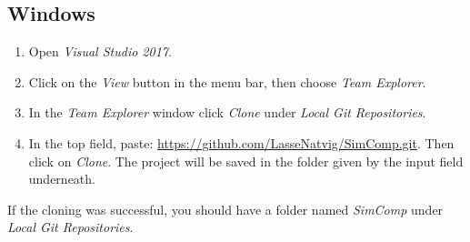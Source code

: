 \subsection{Windows}
\begin{enumerate}
    \item Open \textit{Visual Studio 2017}.
    \item Click on the \textit{View} button in the menu bar, then choose \textit{Team Explorer}.
    \item In the \textit{Team Explorer} window click \textit{Clone} under  \textit{Local Git Repositories}.
    \item In the top field, paste: \url{https://github.com/LasseNatvig/SimComp.git}. Then click on
    \textit{Clone}. The project will be saved in the folder given by the input field underneath.
\end{enumerate}
If the cloning was successful, you should have a folder named \textit{SimComp} under \textit{Local Git Repositories}.
